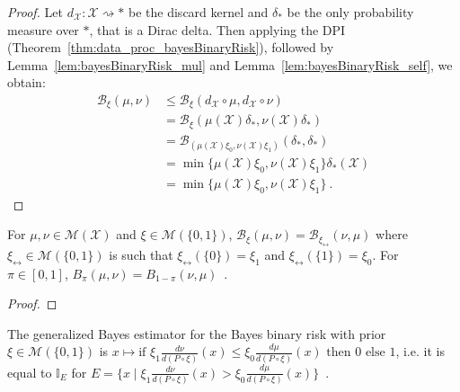 \begin{proof}\leanok
{}
Let $d_{\mathcal X} : \mathcal X \rightsquigarrow *$ be the discard kernel and $\delta_*$ be the only probability measure over $*$, that is a Dirac delta.
Then applying the DPI (Theorem~\ref{thm:data_proc_bayesBinaryRisk}), followed by Lemma~\ref{lem:bayesBinaryRisk_mul} and Lemma~\ref{lem:bayesBinaryRisk_self}, we obtain:
\begin{align*}
\mathcal B_\xi(\mu, \nu)
&\le \mathcal B_\xi(d_{\mathcal X} \circ \mu, d_{\mathcal X} \circ \nu)
\\
&= \mathcal B_\xi(\mu(\mathcal X) \delta_*, \nu(\mathcal X) \delta_*)
\\
&= \mathcal B_{(\mu(\mathcal X) \xi_0, \nu(\mathcal X) \xi_1)}(\delta_*, \delta_*)
\\
&= \min\{\mu(\mathcal X) \xi_0, \nu(\mathcal X) \xi_1\} \delta_*(\mathcal X)
\\
&= \min\{\mu(\mathcal X) \xi_0, \nu(\mathcal X) \xi_1\}
\: .
\end{align*}
\end{proof}


\begin{lemma}
  \label{lem:bayesBinaryRisk_symm}
  \leanok
  For $\mu, \nu \in \mathcal M(\mathcal X)$ and $\xi \in \mathcal M(\{0,1\})$, $\mathcal B_\xi(\mu, \nu) = \mathcal B_{\xi_{\leftrightarrow}}(\nu, \mu)$ where $\xi_{\leftrightarrow} \in \mathcal M(\{0,1\})$ is such that $\xi_{\leftrightarrow}(\{0\}) = \xi_1$ and $\xi_{\leftrightarrow}(\{1\}) = \xi_0$.
  For $\pi \in [0,1]$, $B_\pi(\mu, \nu) = B_{1 - \pi}(\nu, \mu)$~.
\end{lemma}

\begin{proof}\leanok
\uses{}

\end{proof}


\begin{lemma}
  \label{lem:genBayesEstimator_bayesBinaryRisk}
  \leanok
  The generalized Bayes estimator for the Bayes binary risk with prior $\xi \in \mathcal M(\{0,1\})$ is $x \mapsto \text{if } \xi_1\frac{d \nu}{d(P \circ \xi)}(x) \le \xi_0\frac{d \mu}{d(P \circ \xi)}(x) \text{ then } 0 \text{ else } 1$, i.e. it is equal to $\mathbb{I}_E$ for $E = \{x \mid \xi_1\frac{d \nu}{d(P \circ \xi)}(x) > \xi_0\frac{d \mu}{d(P \circ \xi)}(x)\}$~.
\end{lemma}

